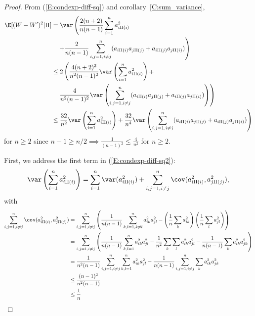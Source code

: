 \begin{theorem}
\begin{proof}
    From (\ref{E:condexp-diff-sq}) and corollary~\ref{C:sum_variance},
    \begin{equation}
      \label{E:condexp-diff-sq2}
      \begin{split}
        \E [(W-W')^2 | \Pi] &= \var \left ( \frac{2(n+2)}{n(n-1)}\sum_{i=1}^n a_{i \Pi(i)}^2
        \right . \\
        &\quad \left . + \frac{2}{n(n-1)}\sum_{i,j=1, i\neq j}^n (a_{i\Pi(i)}a_{j\Pi(j)} +
          a_{i\Pi(j)}a_{j\Pi(i)}) \right ) \\
        &\leq 2 \left ( \frac{4(n+2)^2}{n^2(n-1)^2} \var \left ( \sum_{i=1}^n a_{i \Pi(i)}^2
          \right ) + \right . \\
        &\quad \left .\frac{4}{n^2(n-1)^2} \var \left ( \sum_{i,j=1, i\neq j}^n (a_{i\Pi(i)}a_{j\Pi(j)} +
            a_{i\Pi(j)}a_{j\Pi(i)}) \right ) \right ) \\
        &\leq \frac{32}{n^2}\var \left ( \sum_{i=1}^n a_{i \Pi(i)}^2 \right ) +
        \frac{32}{n^4} \var \left ( \sum_{i,j=1, i\neq j}^n (a_{i\Pi(i)}a_{j\Pi(j)} +
          a_{i\Pi(j)}a_{j\Pi(i)}) \right )
      \end{split}
    \end{equation}
    for $n \geq 2$ since $n-1 \geq n/2 \implies \frac{1}{(n-1)^2} \leq \frac{4}{n^2}$ for $n \geq 2$.

    First, we address the first term in (\ref{E:condexp-diff-sq2}):
    \begin{equation*}
        \var \left ( \sum_{i=1}^n a_{i \Pi(i)}^2 \right ) = \sum_{i=1}^n \var(a_{i \Pi(i)}^2) +
        \sum_{i,j=1, i\neq j}^n \cov(a_{i \Pi(i)}^2, a_{j \Pi(j)}^2),
    \end{equation*}
    with
    \begin{align*}
      \sum_{i,j=1, i\neq j}^n \cov(a_{i \Pi(i)}^2, a_{j \Pi(j)}^2)
      &= \sum_{i,j=1, i\neq j}^n \left ( \frac{1}{n(n-1)} \sum_{k,l=1, k\neq l}^n a_{ik}^2 a_{jl}^2 -
      \left ( \frac{1}{n} \sum_k a_{ik}^2 \right ) \left ( \frac{1}{n} \sum_l a_{jl}^2 \right )
      \right ) \\
      &= \sum_{i,j=1, i\neq j}^n \left ( \frac{1}{n(n-1)} \sum_{k,l=1}^n a_{ik}^2 a_{jl}^2
        - \frac{1}{n^2} \sum_k \sum_l a_{ik}^2 a_{jl}^2
        - \frac{1}{n(n-1)} \sum_k a_{ik}^2 a_{jk}^2 \right ) \\
      &= \frac{1}{n^2(n-1)} \sum_{i,j=1, i\neq j}^n \sum_{k,l=1}^n a_{ik}^2 a_{jl}^2
      - \frac{1}{n(n-1)} \sum_{i,j=1, i\neq j}^n \sum_k a_{ik}^2 a_{jk}^2 \\
      &\leq \frac{(n-1)^2}{n^2(n-1)} \\
      &\leq \frac{1}{n}
    \end{align*}


\end{proof}
\end{theorem}
